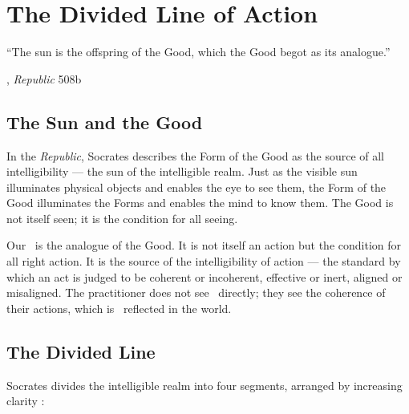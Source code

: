 \chapter{The Divided Line of Action}

\epigraph{``The sun is the offspring of the Good, which the Good begot as its
analogue.''}{\textcite{plato1997complete}, \emph{Republic} 508b}

\section{The Sun and the Good}

In the \emph{Republic}, Socrates describes the Form of the Good as the source
of all intelligibility --- the sun of the intelligible realm. Just as the visible
sun illuminates physical objects and enables the eye to see them, the Form of
the Good illuminates the Forms and enables the mind to know them. The Good is
not itself seen; it is the condition for all seeing.

Our \physis\ is the analogue of the Good. It is not itself an action but the
condition for all right action. It is the source of the intelligibility of
action --- the standard by which an act is judged to be coherent or incoherent,
effective or inert, aligned or misaligned. The practitioner does not see \physis\
directly; they see the coherence of their actions, which is \physis\ reflected
in the world.

\section{The Divided Line}

Socrates divides the intelligible realm into four segments, arranged by
increasing clarity \parencite[VI.509d--511e]{plato1997complete}:

